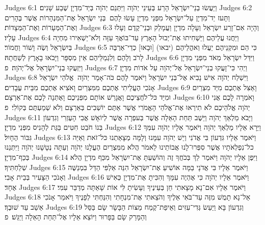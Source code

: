 Judges 6:1	וַיַּעֲשׂוּ בְנֵי־יִשְׂרָאֵל הָרַע בְּעֵינֵי יְהֹוָה וַיִּתְּנֵם יְהֹוָה בְּיַד־מִדְיָן שֶׁבַע שָׁנִים׃
Judges 6:2	וַתָּעז יַד־מִדְיָן עַל־יִשְׂרָאֵל מִפְּנֵי מִדְיָן עָשׂוּ לָהֶם  בְּנֵי יִשְׂרָאֵל אֶת־הַמִּנְהָרוֹת אֲשֶׁר בֶּהָרִים וְאֶת־הַמְּעָרוֹת וְאֶת־הַמְּצָדוֹת׃
Judges 6:3	וְהָיָה אִם־זָרַע יִשְׂרָאֵל וְעָלָה מִדְיָן וַעֲמָלֵק וּבְנֵי־קֶדֶם וְעָלוּ עָלָיו׃
Judges 6:4	וַיַּחֲנוּ עֲלֵיהֶם וַיַּשְׁחִיתוּ אֶת־יְבוּל הָאָרֶץ עַד־בּוֹאֲךָ עַזָּה וְלֹא־יַשְׁאִירוּ מִחְיָה בְּיִשְׂרָאֵל וְשֶׂה וָשׁוֹר וַחֲמוֹר׃
Judges 6:5	כִּי הֵם וּמִקְנֵיהֶם יַעֲלוּ וְאהֳלֵיהֶם (יבאו) [וּבָאוּ] כְדֵי־אַרְבֶּה לָרֹב וְלָהֶם וְלִגְמַלֵּיהֶם אֵין מִסְפָּר וַיָּבֹאוּ בָאָרֶץ לְשַׁחֲתָהּ׃
Judges 6:6	וַיִּדַּל יִשְׂרָאֵל מְאֹד מִפְּנֵי מִדְיָן וַיִּזְעֲקוּ בְנֵי־יִשְׂרָאֵל אֶל־יְהֹוָה׃ {פ}
Judges 6:7	וַיְהִי כִּי־זָעֲקוּ בְנֵי־יִשְׂרָאֵל אֶל־יְהֹוָה עַל אֹדוֹת מִדְיָן׃
Judges 6:8	וַיִּשְׁלַח יְהֹוָה אִישׁ נָבִיא אֶל־בְּנֵי יִשְׂרָאֵל וַיֹּאמֶר לָהֶם כֹּה־אָמַר יְהֹוָה  אֱלֹהֵי יִשְׂרָאֵל אָנֹכִי הֶעֱלֵיתִי אֶתְכֶם מִמִּצְרַיִם וָאֹצִיא אֶתְכֶם מִבֵּית עֲבָדִים׃
Judges 6:9	וָאַצִּל אֶתְכֶם מִיַּד מִצְרַיִם וּמִיַּד כּל־לֹחֲצֵיכֶם וָאֲגָרֵשׁ אוֹתָם מִפְּנֵיכֶם וָאֶתְּנָה לָכֶם אֶת־אַרְצָם׃
Judges 6:10	וָאֹמְרָה לָכֶם אֲנִי יְהֹוָה אֱלֹהֵיכֶם לֹא תִירְאוּ אֶת־אֱלֹהֵי הָאֱמֹרִי אֲשֶׁר אַתֶּם יוֹשְׁבִים בְּאַרְצָם וְלֹא שְׁמַעְתֶּם בְּקוֹלִי׃ {פ}
Judges 6:11	וַיָּבֹא מַלְאַךְ יְהֹוָה וַיֵּשֶׁב תַּחַת הָאֵלָה אֲשֶׁר בְּעפְרָה אֲשֶׁר לְיוֹאָשׁ אֲבִי הָעֶזְרִי וְגִדְעוֹן בְּנוֹ חֹבֵט חִטִּים בַּגַּת לְהָנִיס מִפְּנֵי מִדְיָן׃
Judges 6:12	וַיֵּרָא אֵלָיו מַלְאַךְ יְהֹוָה וַיֹּאמֶר אֵלָיו יְהֹוָה עִמְּךָ גִּבּוֹר הֶחָיִל׃
Judges 6:13	וַיֹּאמֶר אֵלָיו גִּדְעוֹן בִּי אֲדֹנִי וְיֵשׁ יְהֹוָה עִמָּנוּ וְלָמָּה מְצָאַתְנוּ כּל־זֹאת וְאַיֵּה כל־נִפְלְאֹתָיו אֲשֶׁר סִפְּרוּ־לָנוּ אֲבוֹתֵינוּ לֵאמֹר הֲלֹא מִמִּצְרַיִם הֶעֱלָנוּ יְהֹוָה וְעַתָּה נְטָשָׁנוּ יְהֹוָה וַיִּתְּנֵנוּ בְּכַף־מִדְיָן׃
Judges 6:14	וַיִּפֶן אֵלָיו יְהֹוָה וַיֹּאמֶר לֵךְ בְּכֹחֲךָ זֶה וְהוֹשַׁעְתָּ אֶת־יִשְׂרָאֵל מִכַּף מִדְיָן הֲלֹא שְׁלַחְתִּיךָ׃
Judges 6:15	וַיֹּאמֶר אֵלָיו בִּי אֲדֹנָי בַּמָּה אוֹשִׁיעַ אֶת־יִשְׂרָאֵל הִנֵּה אַלְפִּי הַדַּל בִּמְנַשֶּׁה וְאָנֹכִי הַצָּעִיר בְּבֵית אָבִי׃
Judges 6:16	וַיֹּאמֶר אֵלָיו יְהֹוָה כִּי אֶהְיֶה עִמָּךְ וְהִכִּיתָ אֶת־מִדְיָן כְּאִישׁ אֶחָד׃
Judges 6:17	וַיֹּאמֶר אֵלָיו אִם־נָא מָצָאתִי חֵן בְּעֵינֶיךָ וְעָשִׂיתָ לִּי אוֹת שָׁאַתָּה מְדַבֵּר עִמִּי׃
Judges 6:18	אַל־נָא תָמֻשׁ מִזֶּה עַד־בֹּאִי אֵלֶיךָ וְהֹצֵאתִי אֶת־מִנְחָתִי וְהִנַּחְתִּי לְפָנֶיךָ וַיֹּאמַר אָנֹכִי אֵשֵׁב עַד שׁוּבֶךָ׃
Judges 6:19	וְגִדְעוֹן בָּא וַיַּעַשׂ גְּדִי־עִזִּים וְאֵיפַת־קֶמַח מַצּוֹת הַבָּשָׂר שָׂם בַּסַּל וְהַמָּרַק שָׂם בַּפָּרוּר וַיּוֹצֵא אֵלָיו אֶל־תַּחַת הָאֵלָה וַיַּגַּשׁ׃ {פ}
